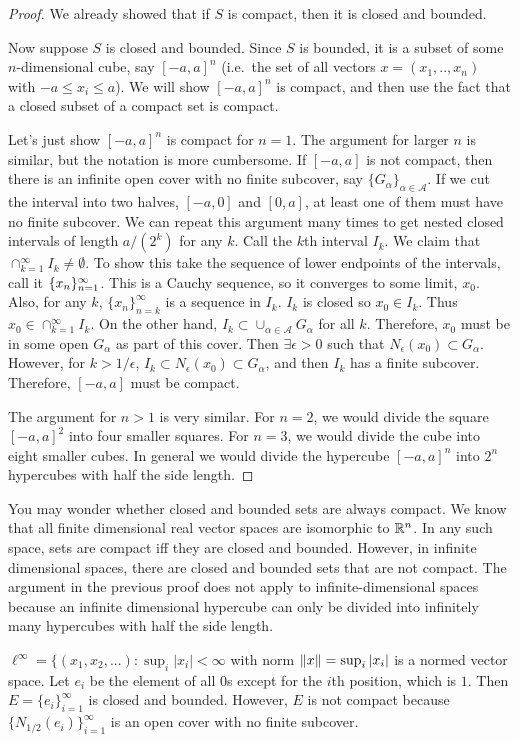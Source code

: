 \begin{proof}
  We already showed that if $S$ is compact, then it is closed and
  bounded. 

  Now suppose $S$ is closed and bounded. Since $S$ is bounded, it is a
  subset of some $n$-dimensional cube, say $[-a,a]^n$ (i.e.\ the set
  of all vectors $x = (x_1,..,x_n)$ with $-a \leq x_i \leq a$).  We
  will show $[-a,a]^n$ is compact, and then use the fact that a
  closed subset of a compact set is compact.

  Let's just show $[-a,a]^n$ is compact for $n=1$. The argument for
  larger $n$ is similar, but the notation is more cumbersome. If
  $[-a,a]$ is not compact, then there is an infinite open cover with
  no finite subcover, say $\{G_\alpha\}_{\alpha \in \mathcal{A}}$. If
  we cut the interval into two halves, $[-a,0]$ and $[0,a]$, at least
  one of them must have no finite subcover. We can repeat this
  argument many times to get nested closed intervals of length
  $a/(2^k)$ for any $k$. Call the $k$th interval $I_k$. We claim that
  $\cap_{k=1}^\infty I_k \neq \emptyset$. To show this take the
  sequence of lower endpoints of the intervals, call it
  $\{{x}_n \}_{n=1}^\infty$. This is a Cauchy sequence, so it converges to some limit,
  $x_0$. Also, for any $k$, $\{x_n\}_{n=k}^\infty$ is a sequence in
  $I_k$. $I_k$ is closed so $x_0 \in I_k$. Thus $x_0 \in
  \cap_{k=1}^\infty I_k$. On the other hand, $I_k \subset \cup_{\alpha
    \in \mathcal{A}} G_\alpha$ for all $k$. Therefore, $x_0$ must be
  in some open $G_\alpha$ as part of this cover. Then $\exists
  \epsilon>0$ such that $N_\epsilon(x_0) \subset G_\alpha$. However,
  for $k>1/\epsilon$, $I_k \subset N_\epsilon(x_0) \subset G_\alpha$,
  and then $I_k$ has a finite subcover. Therefore, $[-a,a]$ must be
  compact. 

  The argument for $n>1$ is very similar. For $n=2$, we would divide
  the square $[-a,a]^2$ into four smaller squares. For $n=3$, we would
  divide the cube into eight smaller cubes. In general we would divide
  the hypercube $[-a,a]^n$ into $2^n$ hypercubes with half the side
  length.
\end{proof}
You may wonder whether closed and bounded sets are always compact. We
know that all finite dimensional real vector spaces are isomorphic to
$\mathbb{R}^n$. In any such space, sets are compact iff they are closed and
bounded. However, in infinite dimensional spaces, there are closed and
bounded sets that are not compact. The argument in the previous proof
does not apply to infinite-dimensional spaces because an infinite
dimensional hypercube can only be divided into infinitely many
hypercubes with half the side length. 
\begin{example}
  $\ell^\infty = \{ (x_1, x_2, ...) : \sup_{i} |x_i| < \infty$ with
  norm $\left\Vert {x} \right\Vert = \sup_{i} |x_i|$ is a normed vector space. Let $e_i$
  be the element of all $0$s except for the $i$th position, which is
  $1$. Then $E = \{e_i\}_{i=1}^\infty$ is closed and bounded. However,
  $E$ is not compact because $\{N_{1/2}(e_i)\}_{i=1}^\infty$ is an
  open cover with no finite subcover. 
\end{example}


